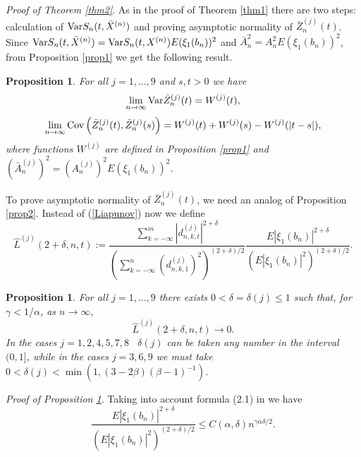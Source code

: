\documentclass[12pt]{article}
\def\a{\alpha}
\def\b{\beta}
\def\d{\delta}
\def\g{\gamma}
\theoremstyle{plain}
\newtheorem{prop}[teo]{Proposition}
\theoremstyle{definition}
\begin{document}
{\it Proof of Theorem \ref{thm2}}.  As in the proof of Theorem \ref{thm1} there are two steps: calculation of ${\rm Var}S_n(t, {\bar X}^{(n)})$ and proving asymptotic normality of ${\bar Z}_n^{(j)}(t)$.
Since ${\rm Var}S_n(t, {\bar X}^{(n)})={\rm Var}S_n(t, X^{(n)})E(\xi_{1}(b_n))^2$ and ${\bar A}_n^{2}=A_n^{2}E(\xi_{1}(b_n))^2$,  from Proposition \ref{prop1} we get the following result.
\begin{prop}\label{prop4} For all $j=1,\dots , 9$ and $s, t >0$ we have
$$%
\lim_{n\to \infty}{\rm Var}{\bar Z}_n^{(j)}(t)= W^{(j)}(t),
$$%
$$%
\lim_{n\to \infty}{\rm Cov}\left ({\bar Z}_n^{(j)}(t), {\bar Z}_n^{(j)}(s)\right )= W^{(j)}(t)+W^{(j)}(s)-W^{(j)}(|t-s|),
$$%
where functions  $W^{(j)}$ are defined in Proposition \ref{prop1} and $({\bar A}_n^{(j)})^2=(A_n^{(j)})^2E(\xi_{1}(b_n))^2$.
\end{prop}
To prove asymptotic normality of ${\bar Z}_n^{(j)}(t)$, we need an analog of Proposition \ref{prop2}. Instead of (\ref{Liapunov}) now we define
$$%
{\hat L}^{(j)}(2+\d,n, t):=\frac{\sum_{k=-\infty}^m |d_{n,k,t}^{(j)}|^{2+\d}}{\left (\sum_{k=-\infty}^n (d_{n,k,1}^{(j)})^2\right )^{(2+\d)/2}}\frac{E|\xi_{1}(b_n)|^{2+\d}}{\left (E|\xi_{1}(b_n)|^{2}\right )^{(2+\d)/2}}.
$$%
\begin{prop}\label{prop5} For all $j=1, \dots , 9$ there exists $0<\d=\d(j)\le 1$ such that, for $\g<1/\a$, as $n\to \infty$,
\begin{equation}\label{Liapunov3A}
{\hat L}^{(j)}(2+\d,n, t) \to 0.
\end{equation}
In the cases $j=1,2,4,5,7,8$ \ $\d(j)$ can be taken any number in the interval $(0, 1]$, while in the cases $j=3,6,9$ we must take  $0<\d(j)<\min (1, (3-2\b)(\b-1)^{-1})$.
\end{prop}
{\it Proof of Proposition \ref{prop5}}.
Taking into account formula (2.1) in \cite{Paul21} we have
\begin{equation}\label{Liapunov4}
\frac{E|\xi_{1}(b_n)|^{2+\d}}{\left (E|\xi_{1}(b_n)|^{2}\right )^{(2+\d)/2}}\le C(\a, \d)n^{\g \a \d/2}.
\end{equation}
\end{document}
